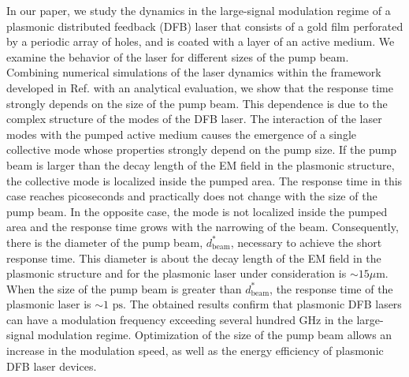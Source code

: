 \documentclass[aps,pra,amsmath,amssymb,onecolumn,superscriptaddress,showpacs,floatfix,]{revtex4-1}
\begin{document}
In our paper, we study the dynamics in the large-signal modulation regime of a plasmonic distributed feedback (DFB) laser that consists of a gold film perforated by a periodic array of holes, and is coated with a layer of an active medium.
We examine the behavior of the laser for different sizes of the pump beam.
Combining numerical simulations of the laser dynamics within the framework developed in Ref. \cite{Zyablovsky2017approach,nefedkin2018acsphot} with an analytical evaluation, we show that the response time strongly depends on the size of the pump beam.
This dependence is due to the complex structure of the modes of the DFB laser.
The interaction of the laser modes with the pumped active medium causes the emergence of a single collective mode whose properties strongly depend on the pump size.
If the pump beam is larger than the decay length of the EM field in the plasmonic structure, the collective mode is localized inside the pumped area.
The response time in this case reaches picoseconds and practically does not change with the size of the pump beam.
In the opposite case, the mode is not localized inside the pumped area and the response time grows with the narrowing of the beam.
Consequently, there is the diameter of the pump beam, $d_{\text{beam}}^*$, necessary to achieve the short response time. This diameter is about the decay length of the EM field in the plasmonic structure and for the plasmonic laser under consideration is $\sim 15 \mu$m. When the size of the pump beam is greater than $d_{\text{beam}}^*$, the response time of the plasmonic laser is $\sim 1$ $\text{ps}$.
The obtained results confirm that plasmonic DFB lasers can have a modulation frequency exceeding several hundred GHz in the large-signal modulation regime. 
Optimization of the size of the pump beam allows an increase in the modulation speed, as well as the energy efficiency of plasmonic DFB laser devices.
\end{document}
